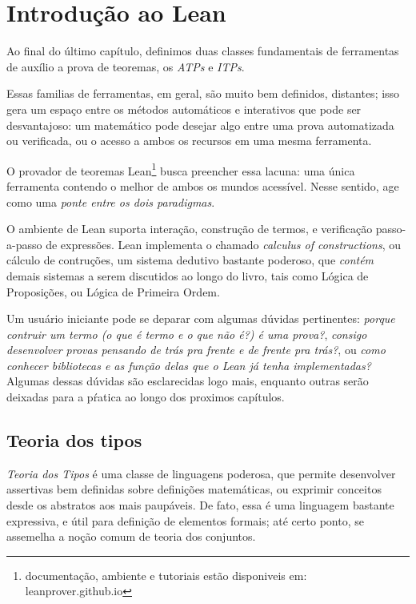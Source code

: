 \chapter{Introdução ao Lean }

Ao final do último capítulo, definimos duas classes fundamentais de ferramentas de auxílio a prova de teoremas, os \textit{ATPs} e \textit{ITPs}.

Essas familias de ferramentas, em geral, são muito bem definidos, distantes; isso gera um espaço entre os métodos automáticos e interativos que pode ser desvantajoso: um  matemático pode desejar algo entre uma prova automatizada ou verificada, ou o acesso a ambos os recursos em uma mesma ferramenta.

O provador de teoremas Lean\footnote{documentação, ambiente e tutoriais estão disponiveis em: leanprover.github.io} busca preencher essa lacuna: uma única ferramenta contendo o melhor de ambos os mundos acessível.
Nesse sentido, age como uma \textit{ponte entre os dois paradigmas}.


O ambiente de Lean suporta interação, construção de termos, e verificação passo-a-passo de expressões.
Lean implementa o chamado \textit{calculus of constructions}, ou cálculo de contruções, um sistema dedutivo bastante poderoso, que \textit{contém} demais sistemas a serem discutidos ao longo do livro, tais como Lógica de Proposições, ou Lógica de Primeira Ordem.

Um usuário iniciante pode se deparar com algumas dúvidas pertinentes: \textit{porque contruir um termo (o que é termo e o que não é?) é uma prova?}, \textit{consigo desenvolver provas pensando de trás pra frente e de frente pra trás?}, ou \textit{como conhecer bibliotecas e as função delas que o Lean já tenha implementadas?} Algumas dessas dúvidas são esclarecidas logo mais, enquanto outras serão deixadas para a pŕatica ao longo dos proximos capítulos.

\section{Teoria dos tipos}
\textit{Teoria dos Tipos} é uma classe de linguagens poderosa, que permite desenvolver assertivas bem definidas sobre definições matemáticas, ou exprimir conceitos desde os abstratos aos mais paupáveis.
De fato, essa é uma linguagem bastante expressiva, e útil para definição de elementos formais; até certo ponto, se assemelha a noção comum de teoria dos conjuntos.

